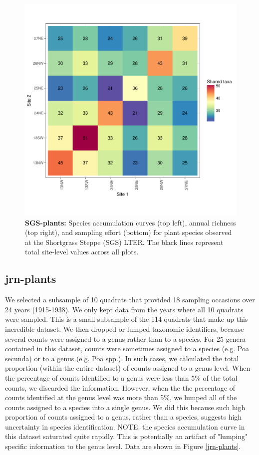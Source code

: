 \documentclass[11pt, oneside]{article}
\begin{document}
\begin{figure}[h!]
\includegraphics[scale = 0.4]{sgs-plants-catano_spp_shared.pdf}
\caption{{\bf SGS-plants:} Species accumulation curves (top left),  annual richness (top right), and sampling effort (bottom)  for plant species observed at the Shortgrass Steppe (SGS) LTER. The black lines represent total site-level values across all plots.}
\label{sgs-plants}
\end{figure}

\subsection{jrn-plants}
We selected a subsample of 10 quadrats that provided 18 sampling occasions over 24 years (1915-1938). We only kept data from the years where all 10 quadrats were sampled.
This is a small subsample of the 114 quadrats that make up this incredible dataset. 
We then dropped or lumped taxonomic identifiers, because several counts were assigned to a genus rather than to a species. 
For 25 genera contained in this dataset, counts were sometimes assigned to a species (e.g. Poa secunda) or to a genus (e.g. Poa spp.). 
In such cases, we calculated the total proportion (within the entire dataset) of counts assigned to a genus level. 
When the percentage of counts identified to a genus were less than 5$\%$ of the total counts, we discarded the information. 
However, when the the percentage of counts identified at the genus level was more than 5$\%$, we lumped all of the counts assigned to a species into a single genus. 
We did this because such high proportion of counts assigned to a genus, rather than a species, suggests high uncertainty in species identification.
NOTE: the species accumulation curve in this dataset saturated quite rapidly. This is potentially an artifact of "lumping" specific information to the genus level. 
Data are shown in Figure \ref{jrn-plants}.
\end{document}
